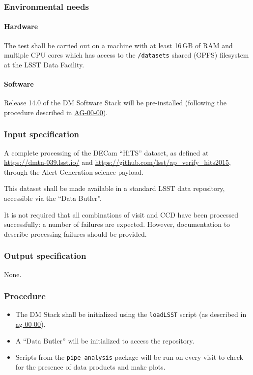 \subsubsection{Environmental needs}

\paragraph{Hardware}

The test shall be carried out on a machine with at least 16\,GB of RAM and
multiple CPU cores which has access to the \texttt{/datasets} shared (GPFS)
filesystem at the LSST Data Facility.

\paragraph{Software}

Release 14.0 of the DM Software Stack will be pre-installed (following the
procedure described in \hyperref[ag-00-00]{AG-00-00}).

\subsubsection{Input specification}

A complete processing of the DECam ``HiTS'' dataset, as defined at
\url{https://dmtn-039.lsst.io/} and
\url{https://github.com/lsst/ap_verify_hits2015}, through the Alert
Generation science payload.

This dataset shall be made available in a standard LSST data repository,
accessible via the ``Data Butler''.

It is not required that all combinations of visit and CCD have been processed
successfully: a number of failures are expected. However, documentation to
describe processing failures should be provided.

\subsubsection{Output specification}

None.

\subsubsection{Procedure}

\begin{itemize}

  \item{The DM Stack shall be initialized using the \texttt{loadLSST} script
  (as described in \hyperref[ag-00-00]{ag-00-00}).}

  \item{A ``Data Butler'' will be initialized to access the repository.}

  \item{Scripts from the \texttt{pipe\_analysis} package will be run on every visit to check for the presence of data products and make plots.}

\end{itemize}
